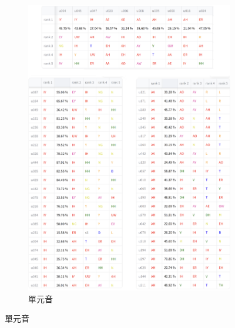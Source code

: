         {
        \newcommand{\tempwidth}[0]{0.8\linewidth}
        \begin{figure}
        \ContinuedFloat
        
             \centering
             \begin{subfigure}{\textwidth}
                 \centering
                 \includegraphics[width=\tempwidth]{figures/ch4figs/vow_phn.png}
                 \caption{單元音}
                 \label{fig:hub-u050-ap0500-vowobs}
             \end{subfigure}

                         \label{fig:hub-u050-phnobserver--3}
        \end{figure}
    }

